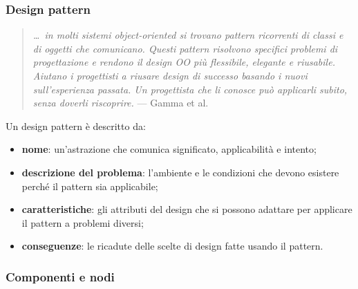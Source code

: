 \documentclass[a4paper,12pt]{article}
\begin{document}
\subsubsection{Design pattern}
\begin{quote}
\emph{\ldots\ in molti sistemi object-oriented si trovano pattern ricorrenti di classi e
di oggetti che comunicano. Questi pattern risolvono specifici problemi di progettazione e
rendono il design OO più flessibile, elegante e riusabile. Aiutano i progettisti a
riusare design di successo basando i nuovi sull'esperienza passata. Un progettista che li
conosce può applicarli subito, senza doverli riscoprire.} --- Gamma et al.
\end{quote}
Un design pattern è descritto da:
\begin{itemize}
  \item \textbf{nome}: un'astrazione che comunica significato, applicabilità e intento;
  \item \textbf{descrizione del problema}: l'ambiente e le condizioni che devono esistere
        perché il pattern sia applicabile;
  \item \textbf{caratteristiche}: gli attributi del design che si possono adattare per
        applicare il pattern a problemi diversi;
  \item \textbf{conseguenze}: le ricadute delle scelte di design fatte usando il pattern.
\end{itemize}




































\subsubsection{Componenti e nodi}
\end{document}
